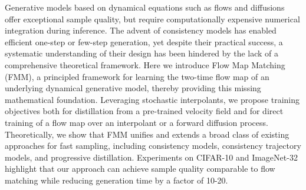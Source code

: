 Generative models based on dynamical equations such as flows and diffusions offer exceptional sample quality, but require computationally expensive numerical integration during inference.
%
The advent of consistency models has enabled efficient one-step or few-step generation, yet despite their practical success, a systematic understanding of their design has been hindered by the lack of a comprehensive theoretical framework.
%
Here we introduce Flow Map Matching (FMM), a principled framework for learning the two-time flow map of an underlying dynamical generative model, thereby providing this missing mathematical foundation.
%
Leveraging stochastic interpolants, we propose training objectives both for distillation from a pre-trained velocity field and for direct training of a flow map over an interpolant or a forward diffusion process.
%
Theoretically, we show that FMM unifies and extends a broad class of existing approaches for fast sampling, including consistency models, consistency trajectory models, and progressive distillation.
%
Experiments on CIFAR-10 and ImageNet-32 highlight that our approach can achieve sample quality comparable to flow matching while reducing generation time by a factor of 10-20.
